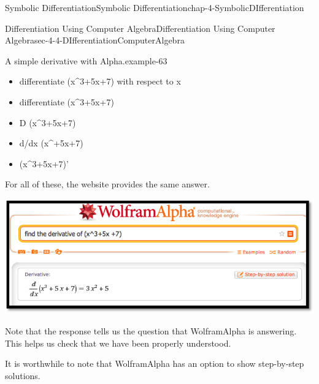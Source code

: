 \documentclass[oneside,10pt,]{book}
\numberwithin{equation}{section}
\begin{document}
\begin{chapterptx}{Symbolic Differentiation}{}{Symbolic Differentiation}{}{}{chap-4-SymbolicDIfferentiation}
\begin{sectionptx}{Differentiation Using Computer Algebra}{}{Differentiation Using Computer Algebra}{}{}{sec-4-4-DIfferentiationComputerAlgebra}
\begin{example}{A simple derivative with Alpha.}{example-63}
\begin{itemize}[label=\textbullet]
derivative of (x\textasciicircum{}3+5x+7)%
\item{}\hypertarget{p-1708}{}%
differentiate (x\textasciicircum{}3+5x+7) with respect to x%
\item{}\hypertarget{p-1709}{}%
differentiate (x\textasciicircum{}3+5x+7)%
\item{}\hypertarget{p-1710}{}%
D (x\textasciicircum{}3+5x+7)%
\item{}\hypertarget{p-1711}{}%
d\slash{}dx (x\textasciicircum{}+5x+7)%
\item{}\hypertarget{p-1712}{}%
(x\textasciicircum{}3+5x+7)'%
\end{itemize}
\hypertarget{p-1713}{}%
For all of these, the website provides the same answer.%
\begin{sidebyside}{1}{0.05}{0.05}{0}%
\begin{sbspanel}{0.9}%
\includegraphics[width=1\linewidth]{images/sec4-4-2.png}
\end{sbspanel}%
\end{sidebyside}%
\end{example}
\hypertarget{p-1714}{}%
Note that the response tells us the question that Wolfram\textbar{}Alpha is answering.  This helps us check that we have been properly understood.%
\par
\hypertarget{p-1715}{}%
It is worthwhile to note that Wolfram\textbar{}Alpha has an option to show step-by-step solutions.%
\begin{sidebyside}{1}{0.15}{0.15}{0}%
\begin{sbspanel}{0.7}%

\end{sbspanel}
\end{sidebyside}
\end{sectionptx}
\end{chapterptx}
\end{document}
